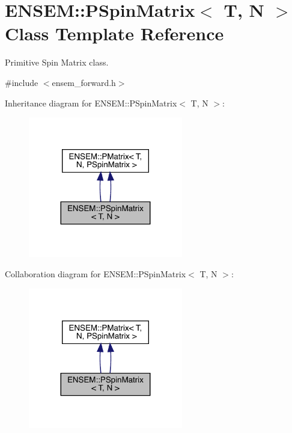 \hypertarget{classENSEM_1_1PSpinMatrix}{}\section{E\+N\+S\+EM\+:\+:P\+Spin\+Matrix$<$ T, N $>$ Class Template Reference}
\label{classENSEM_1_1PSpinMatrix}


Primitive Spin Matrix class.  




{\ttfamily \#include $<$ensem\+\_\+forward.\+h$>$}



Inheritance diagram for E\+N\+S\+EM\+:\+:P\+Spin\+Matrix$<$ T, N $>$\+:\nopagebreak
\begin{figure}[H]
\begin{center}
\leavevmode
\includegraphics[width=191pt]{db/de9/classENSEM_1_1PSpinMatrix__inherit__graph}
\end{center}
\end{figure}


Collaboration diagram for E\+N\+S\+EM\+:\+:P\+Spin\+Matrix$<$ T, N $>$\+:\nopagebreak
\begin{figure}[H]
\begin{center}
\leavevmode
\includegraphics[width=191pt]{d2/d1d/classENSEM_1_1PSpinMatrix__coll__graph}
\end{center}
\end{figure}
